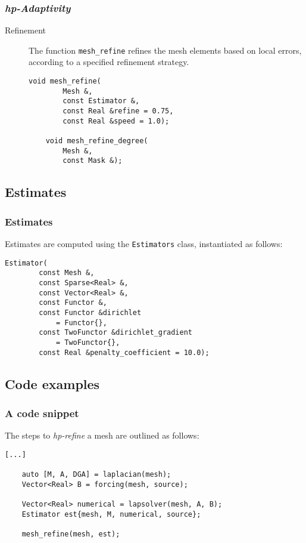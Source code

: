 \begin{frame}[fragile]
    \frametitle{\textit{hp-Adaptivity}}

    \begin{description}
        \item[Refinement] The function \lstinline{mesh_refine} refines the mesh elements based on local errors, according to a specified refinement strategy.

    \begin{lstlisting}[style=cpp]
    void mesh_refine(
        Mesh &, 
        const Estimator &, 
        const Real &refine = 0.75, 
        const Real &speed = 1.0);

    void mesh_refine_degree(
        Mesh &, 
        const Mask &);
    \end{lstlisting}
    \end{description}

\end{frame}

\subsection{Estimates}

\begin{frame}[fragile]
    \frametitle{Estimates}

    Estimates are computed using the \lstinline{Estimators} class, instantiated as follows:

    \begin{lstlisting}[style=cpp]
    Estimator(
        const Mesh &, 
        const Sparse<Real> &, 
        const Vector<Real> &, 
        const Functor &, 
        const Functor &dirichlet
            = Functor{}, 
        const TwoFunctor &dirichlet_gradient
            = TwoFunctor{}, 
        const Real &penalty_coefficient = 10.0);
    \end{lstlisting}

\end{frame}

\subsection{Code examples}

\begin{frame}[fragile]
    \frametitle{A code snippet}

    The steps to \textit{hp-refine} a mesh are outlined as follows:

    \begin{lstlisting}[style=cpp]
    [...]

    auto [M, A, DGA] = laplacian(mesh);
    Vector<Real> B = forcing(mesh, source);

    Vector<Real> numerical = lapsolver(mesh, A, B);
    Estimator est{mesh, M, numerical, source};

    mesh_refine(mesh, est);
    \end{lstlisting}

\end{frame}